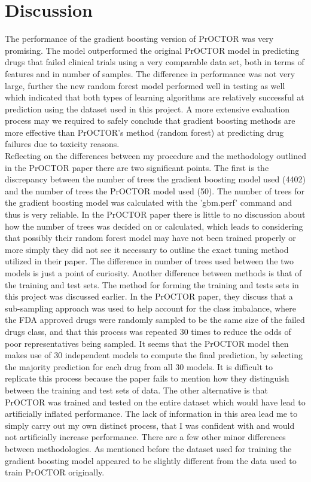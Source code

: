 \documentclass[12pt]{article}
\begin{document}
\section{Discussion}
The performance of the gradient boosting version of PrOCTOR was very promising. The model outperformed the original PrOCTOR model in predicting drugs that failed clinical trials using a very comparable data set, both in terms of features and in number of samples. The difference in performance was not very large, further the new random forest model performed  well in testing as well which indicated that both types of learning algorithms are relatively successful at prediction using the dataset used in this project. A more extensive evaluation process may we required to safely conclude that gradient boosting methods are more effective than PrOCTOR's method (random forest) at predicting drug failures due to toxicity reasons. \\
Reflecting on the differences between my procedure and the methodology outlined in the PrOCTOR paper there are two significant points. The first is the discrepancy between the number of trees the gradient boosting model used (4402) and the number of trees the PrOCTOR model used (50). The number of trees for the gradient boosting model was calculated with the 'gbm.perf' command and thus is very reliable. In the PrOCTOR paper there is little to no discussion about how the number of trees was decided on or calculated, which leads to considering that possibly their random forest model may have not been trained properly or more simply they did not see it necessary to outline the exact tuning method utilized in their paper. The difference in number of trees used between the two models is just a point of curiosity. Another difference between methods is that of the training and test sets. The method for forming the training and tests sets in this project was discussed earlier. In the PrOCTOR paper, they discuss that a sub-sampling approach was used to help account for the class imbalance, where the FDA approved drugs were randomly sampled to be the same size of the failed drugs class, and that this process was repeated 30 times to reduce the odds of poor representatives being sampled. It seems that the PrOCTOR model then makes use of 30 independent models to compute the final prediction, by selecting the majority prediction for each drug from all 30 models. It is difficult to replicate this process because the paper fails to mention how they distinguish between the training and test sets of data. The other alternative is that PrOCTOR was trained and tested on the entire dataset which would have lead to artificially inflated performance. The lack of information in this area lead me to simply carry out my own distinct process, that I was confident with and would not artificially increase performance. There are a few other minor differences between methodologies. As mentioned before the dataset used for training the gradient boosting model appeared to be slightly different from the data used to train PrOCTOR originally.
\end{document}
